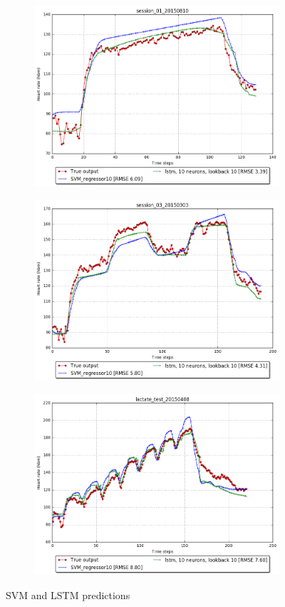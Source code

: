     \begin{figure}[H]
        \centering
        \begin{subfigure}{0.9\textwidth}
            \centering
            \includegraphics[width=0.9\linewidth]{../images/prediction_svm_lstm10_session1.png}
        \end{subfigure}%

        \begin{subfigure}{0.9\textwidth}
            \centering
            \includegraphics[width=0.9\linewidth]{../images/prediction_svm_lstm10_session3.png}
        \end{subfigure}

        \begin{subfigure}{0.9\textwidth}
            \centering
            \includegraphics[width=0.9\linewidth]{../images/prediction_svm_lstm10_lactate.png}
        \end{subfigure}
        \caption{SVM and LSTM predictions} \label{fig:predictions}
    \end{figure}

